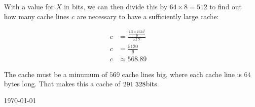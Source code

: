 \documentclass[fontsize=11pt, paper=a4, titlepage]{article}
\begin{document}
\begin{enumerate}[a)]
With a value for $X$ in bits, we can then divide this by $64\times 8 = 512$ to
find out how many cache lines $c$ are necessary to have a sufficiently large
cache:

    \begin{align*}
        c &= \frac{\frac{2.5\times 1024^2}{9}}{512} \\
        c &= \frac{5120}{9} \\
        c &\approx 568.89
    \end{align*}

The cache must be a minumum of $569$ cache lines big, where each cache line is
$64$ bytes long. That makes this a cache of $291\thickspace 328$bits.

\end{enumerate}

\vfill
\hfill \large{\today}
\end{document}
